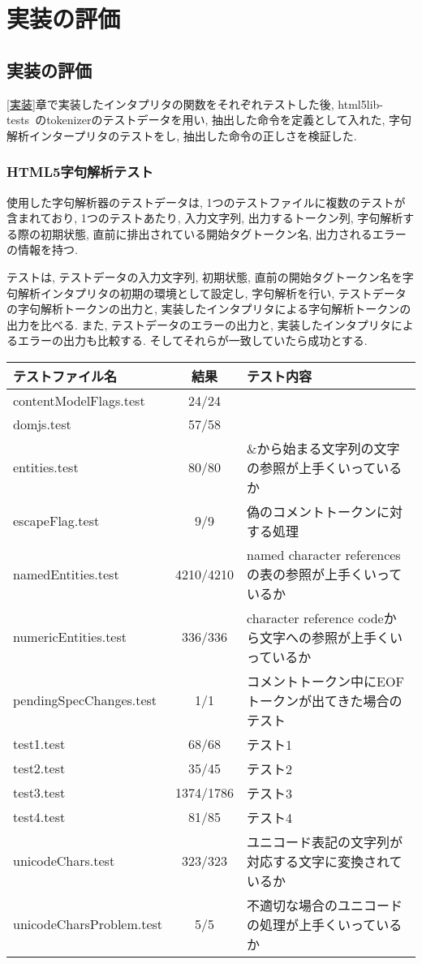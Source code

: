 \documentclass[uplatex,a4j]{jsreport}
\begin{document}
\chapter{実装の評価}
\label{評価}
\section{実装の評価}
\ref{実装}章で実装したインタプリタの関数をそれぞれテストした後,  
html5lib-tests~\cite{html5lib-tests}のtokenizerのテストデータを用い, 抽出した命令を定義として入れた, 字句解析インタープリタのテストをし, 抽出した命令の正しさを検証した.
\subsection{HTML5字句解析テスト}
使用した字句解析器のテストデータは, 1つのテストファイルに複数のテストが含まれており, 
1つのテストあたり, 入力文字列, 出力するトークン列, 字句解析する際の初期状態, 直前に排出されている開始タグトークン名, 出力されるエラーの情報を持つ. 

テストは, テストデータの入力文字列, 初期状態, 直前の開始タグトークン名を字句解析インタプリタの初期の環境として設定し, 
字句解析を行い, 
テストデータの字句解析トークンの出力と, 実装したインタプリタによる字句解析トークンの出力を比べる. 
また, テストデータのエラーの出力と, 実装したインタプリタによるエラーの出力も比較する. 
そしてそれらが一致していたら成功とする. 
\begin{table}[htb]
    \begin{tabular}{|l|c|l|} \hline
      テストファイル名 & 結果 & テスト内容\\ \hline 
      contentModelFlags.test & 24/24 &  \\
      domjs.test & 57/58 &  \\
      entities.test & 80/80 & \&から始まる文字列の文字の参照が上手くいっているか\\
      escapeFlag.test & 9/9 & 偽のコメントトークンに対する処理\\
      namedEntities.test & 4210/4210 & named character referencesの表の参照が上手くいっているか\\
      numericEntities.test & 336/336 & character reference codeから文字への参照が上手くいっているか\\
      pendingSpecChanges.test & 1/1 & コメントトークン中にEOFトークンが出てきた場合のテスト\\
      test1.test & 68/68 & テスト1 \\
      test2.test & 35/45 & テスト2 \\
      test3.test & 1374/1786 & テスト3 \\
      test4.test & 81/85 & テスト4 \\
      unicodeChars.test & 323/323 & ユニコード表記の文字列が対応する文字に変換されているか\\
      unicodeCharsProblem.test & 5/5 & 不適切な場合のユニコードの処理が上手くいっているか\\ \hline 
    \end{tabular}
\end{table}
\end{document}
